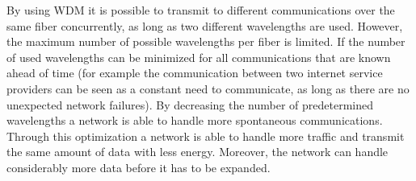 \documentclass[paper=a4,fontsize=12pt]{scrartcl}
\begin{document}

By using WDM it is possible to transmit to different communications over the same fiber concurrently, as long as two different wavelengths are used. However, the maximum number of possible wavelengths per fiber is limited. If the number of used wavelengths can be minimized for all communications that are known ahead of time (for example the communication between two internet service providers can be seen as a constant need to communicate, as long as there are no unexpected network failures). By decreasing the number of predetermined wavelengths a network is able to handle more spontaneous communications. Through this optimization a network is able to handle more traffic and transmit the same amount of data with less energy. Moreover, the network can handle considerably more data before it has to be expanded.

\end{document}
